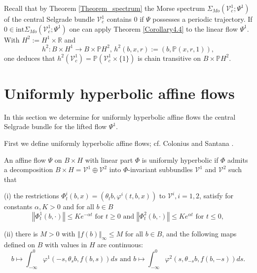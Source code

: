 	\begin{remark}
		Recall that by Theorem \ref{Theorem_spectrum} the Morse spectrum $\Sigma
		_{Mo}(\mathcal{V}_{c}^{1};\Psi^{1})$ of the central Selgrade bundle
		$\mathcal{V}_{c}^{1}$ contains $0$ if $\Psi$ possesses a periodic trajectory.
		If $0\in\mathrm{int}\Sigma_{Mo}(\mathcal{V}_{c}^{1};\Psi^{1})$ one can apply
		Theorem \ref{Corollary4.4} to the linear flow $\Psi^{1}$. With $H^{2}
		:=H^{1}\times\mathbb{R}$ and
		\[
		h^{2}:B\times H^{1}\rightarrow B\times\mathbb{P}H^{2},\,h^{2}
		(b,x,r):=(b,\mathbb{P}(x,r,1)),
		\]
		one deduces that $h^{2}(\mathcal{V}_{c}^{1})=\mathbb{P}\left(  \mathcal{V}
		_{c}^{1}\times\{1\}\right)  $ is chain transitive on $B\times\mathbb{P}H^{2}$.
	\end{remark}
	
	\section{Uniformly hyperbolic affine flows\label{Section5}}
	
	In this section we determine for uniformly hyperbolic affine flows the central
	Selgrade bundle for the lifted flow $\Psi^{1}$.
	
	First we define uniformly hyperbolic affine flows; cf. Colonius and Santana
	\cite{ColSan11}.
	
	\begin{definition}
		An affine flow $\Psi$ on $B\times H$ with linear part $\Phi$ is uniformly
		hyperbolic if $\Phi$ admits a decomposition $B\times H=\mathcal{V}^{1}
		\oplus\mathcal{V}^{2}$ into $\Phi$-invariant subbundles $\mathcal{V}^{1}$ and
		$\mathcal{V}^{2}$ such that
		
		(i) the restrictions $\Phi_{t}^{i}(b,x)=\left(  \theta_{t}b,\varphi
		^{i}(t,b,x)\right)  $ to $\mathcal{V}^{i},i=1,2$, satisfy for constants
		$\alpha,K>0$ and for all $b\in B$
		\[
		\left\Vert \Phi_{t}^{1}(b,\cdot)\right\Vert \leq Ke^{-\alpha t}\mbox{ for
		}t\geq0\mbox{ and }\left\Vert \Phi_{t}^{2}(b,\cdot)\right\Vert \leq
		Ke^{\alpha t}\mbox{ for }t\leq0,
		\]
		
		
		(ii) there is $M>0$ with $\left\Vert f(b)\right\Vert _{\infty}\leq M$ for all
		$b\in B$, and the following maps defined on $B$ with values in $H$ are
		continuous:
		\[
		b\mapsto\int_{-\infty}^{0}\varphi^{1}(-s,\theta_{s}b,f(b,s))ds\mbox{ and
		}b\mapsto\int_{-\infty}^{0}\varphi^{2}(s,\theta_{-s}b,f(b,-s))ds.
		\]
		
	\end{definition}
	
